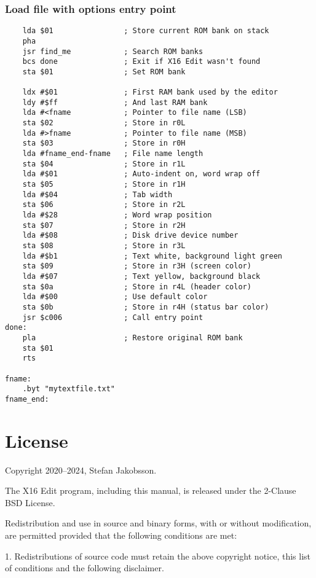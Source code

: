 \documentclass{article}
\begin{document}
    \subsubsection{Load file with options entry point}
\begin{verbatim}
    lda $01                ; Store current ROM bank on stack
    pha
    jsr find_me            ; Search ROM banks
    bcs done               ; Exit if X16 Edit wasn't found
    sta $01                ; Set ROM bank
    
    ldx #$01               ; First RAM bank used by the editor
    ldy #$ff               ; And last RAM bank
    lda #<fname            ; Pointer to file name (LSB)
    sta $02                ; Store in r0L
    lda #>fname            ; Pointer to file name (MSB)
    sta $03                ; Store in r0H
    lda #fname_end-fname   ; File name length
    sta $04                ; Store in r1L
    lda #$01               ; Auto-indent on, word wrap off
    sta $05                ; Store in r1H
    lda #$04               ; Tab width
    sta $06                ; Store in r2L
    lda #$28               ; Word wrap position
    sta $07                ; Store in r2H
    lda #$08               ; Disk drive device number
    sta $08                ; Store in r3L
    lda #$b1               ; Text white, background light green
    sta $09                ; Store in r3H (screen color)
    lda #$07               ; Text yellow, background black
    sta $0a                ; Store in r4L (header color)
    lda #$00               ; Use default color
    sta $0b                ; Store in r4H (status bar color)
    jsr $c006              ; Call entry point
done:
    pla                    ; Restore original ROM bank
    sta $01
    rts
   
fname:
    .byt "mytextfile.txt"
fname_end:
\end{verbatim}

\section{License}
	Copyright 2020--2024, Stefan Jakobsson.

	The X16 Edit program, including this manual, is released under the 2-Clause BSD
    License.
    
    Redistribution and use in source and binary forms, with or without modification, 
    are permitted provided that the following conditions are met:

    1. Redistributions of source code must retain the above copyright notice, this 
       list of conditions and the following disclaimer.
\end{document}

